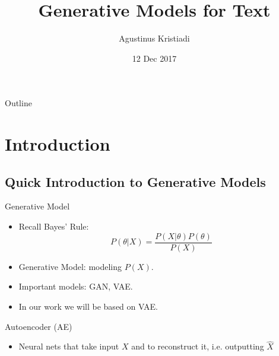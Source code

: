 \documentclass{beamer}
\title[Generative Models for Text]{Generative Models for Text}
\author{Agustinus Kristiadi}
\institute{University of Bonn}
\date{12 Dec 2017}
\begin{document}
    \begin{frame}
      \titlepage
    \end{frame}

    \begin{frame}{Outline}
     \tableofcontents
    \end{frame}


    \section{Introduction}

    \subsection{Quick Introduction to Generative Models}

    \begin{frame}{Generative Model}

    \begin{itemize}
        \item Recall Bayes' Rule:
        $$P(\theta \vert X) = \frac{P(X \vert \theta) P(\theta)}{P(X)}$$
        \item Generative Model: modeling $P(X)$.
        \item Important models: GAN, VAE.
        \item In our work we will be based on VAE.
    \end{itemize}

    \end{frame}

    \begin{frame}{Autoencoder (AE)}

      \begin{itemize}
          \item Neural nets that take input $X$ and to reconstruct it, i.e. outputting $\hat{X}$

      \end{itemize}


    \end{frame}
\end{document}
